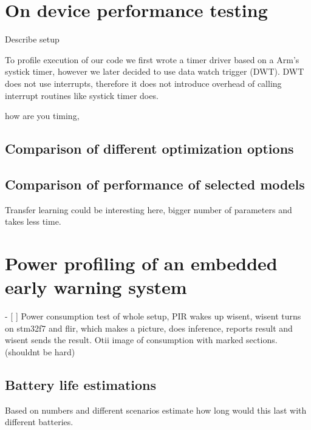 \section{ On device performance testing}
Describe setup

To profile execution of our code we first wrote a timer driver based on a Arm's systick timer, however we later decided to use data watch trigger (DWT).
DWT does not use interrupts, therefore it does not introduce overhead of calling interrupt routines like systick timer does.


      how are you timing, 

\subsection{ Comparison of different optimization options}
\subsection{ Comparison of performance of selected models}
    Transfer learning could be interesting here, bigger number of parameters and takes less time.






\section{ Power profiling of an embedded early warning system}
- [ ] Power consumption test of whole setup, 
      PIR wakes up wisent, 
      wisent turns on stm32f7 and flir, 
      which makes a picture, does inference, reports result and wisent sends the result. 
      Otii image of consumption with marked sections.(shouldnt be hard)

\subsection{ Battery life estimations}
Based on numbers and different scenarios estimate how long would this last with different batteries.
